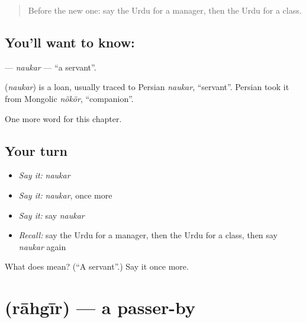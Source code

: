 \label{lesson:UR-C211-naukar}



\begin{quote}
Before the new one: say the Urdu for a manager, then the Urdu for a class.
\end{quote}

\subsection*{You'll want to know: }
\textbf{} — \emph{naukar} — \textquotedblleft{}a servant\textquotedblright{}.

\begin{cousinweb}
\textbf{} (\emph{naukar}) is a loan, usually traced to Persian \emph{naukar}, \textquotedblleft{}servant\textquotedblright{}. Persian took it from Mongolic \emph{nökör}, \textquotedblleft{}companion\textquotedblright{}.
\end{cousinweb}

\begin{grammarlens}[title={What you've built}]
One more word for this chapter.
\end{grammarlens}

\subsection*{Your turn}
\begin{itemize}
\raggedright
  \item \emph{Say it:} \emph{naukar}
  \item \emph{Say it:} \emph{naukar}, once more
  \item \emph{Say it:} say \emph{naukar}
  \item \emph{Recall:} say the Urdu for a manager, then the Urdu for a class, then say \emph{naukar} again
\end{itemize}

\begin{tcolorbox}[breakable,colback=teal!4,colframe=teal!35!black,title={Before you move on}]
What does  mean? (\textquotedblleft{}A servant\textquotedblright{}.) Say it once more.
\end{tcolorbox}
\section[\texorpdfstring{\ur{راہگیر} (rāhgīr)}{راہگیر (rāhgīr)}]{ (rāhgīr) — a passer-by}

\label{lesson:UR-C211-rahgir}



